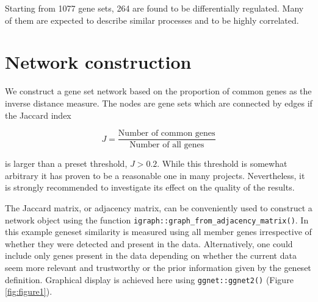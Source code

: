 \documentclass[9pt,a4paper,]{extarticle}
\newenvironment{Shaded}{\begin{snugshade}}{\end{snugshade}}
\newcommand{\KeywordTok}[1]{\textcolor[rgb]{0.13,0.29,0.53}{\textbf{#1}}}
\newcommand{\DecValTok}[1]{\textcolor[rgb]{0.00,0.00,0.81}{#1}}
\newcommand{\StringTok}[1]{\textcolor[rgb]{0.31,0.60,0.02}{#1}}
\newcommand{\CommentTok}[1]{\textcolor[rgb]{0.56,0.35,0.01}{\textit{#1}}}
\newcommand{\ControlFlowTok}[1]{\textcolor[rgb]{0.13,0.29,0.53}{\textbf{#1}}}
\newcommand{\OperatorTok}[1]{\textcolor[rgb]{0.81,0.36,0.00}{\textbf{#1}}}
\newcommand{\NormalTok}[1]{#1}
\theoremstyle{definition}
\theoremstyle{definition}
\theoremstyle{definition}
\theoremstyle{remark}
\begin{document}
Starting from 1077 gene sets, 264 are found to be differentially regulated. Many of them are expected to describe similar processes and to be highly correlated.

\section{Network construction}\label{network-construction}

We construct a gene set network based on the proportion of common genes as the inverse distance measure. The nodes are gene sets which are connected by edges if the Jaccard index

\[ J = \frac{\text{Number of common genes}}{\text{Number of all genes}} \]

is larger than a preset threshold, \(J > 0.2\). While this threshold is somewhat arbitrary it has proven to be a reasonable one in many projects. Nevertheless, it is strongly recommended to investigate its effect on the quality of the results.

\begin{Shaded}
\end{Shaded}

The Jaccard matrix, or adjacency matrix, can be conveniently used to construct a network object using the function \texttt{igraph::graph\_from\_adjacency\_matrix()}. In this example geneset similarity is measured using all member genes irrespective of whether they were detected and present in the data. Alternatively, one could include only genes present in the data depending on whether the current data seem more relevant and trustworthy or the prior information given by the geneset definition. Graphical display is achieved here using \texttt{ggnet::ggnet2()} (Figure \ref{fig:figure1}).
\end{document}
